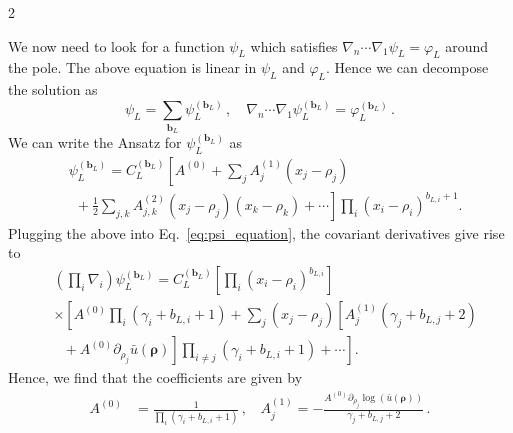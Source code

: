 \documentclass[fleqn]{2023SCGE}
\newcommand{\nn}{\nonumber}
\begin{document}
\begin{multicols}{2}
\begin{appendix}
We now need to look for a function $\psi_L$ which satisfies $\nabla_n \cdots \nabla_1 \psi_L = \varphi_L$ around the pole.
The above equation is linear in $\psi_L$ and $\varphi_L$. Hence we can decompose the solution as
\begin{equation}
    \psi_L = \sum_{\bm{b}_L} \psi_L^{(\bm{b}_L)} \, , \quad \nabla_n \cdots \nabla_1 \psi_L^{(\bm{b}_L)} = \varphi_L^{(\bm{b}_L)} \, .
    \label{eq:psi_equation}
\end{equation}
We can write the Ansatz for $\psi_L^{(\bm{b}_L)}$ as 
\begin{align}
&\psi_L^{(\bm{b}_L)} = C_L^{(\bm{b}_L)} \left[ A^{(0)} + \sum_j A^{(1)}_j (x_j - \rho_j) \right. \nn \\
&\left. ~~ + \frac{1}{2} \sum_{j,k} A^{(2)}_{j,k} (x_j-\rho_j) (x_k-\rho_k) + \cdots \right] \prod_i (x_i   -\rho_i)^{b_{L,i} + 1} .
\end{align}
Plugging the above into Eq.~\eqref{eq:psi_equation}, the covariant derivatives give rise to
\begin{align}
    &\left( \prod_i \nabla_i \right) \psi_L^{(\bm{b}_L)} = C_L^{(\bm{b}_L)} \left[ \prod_i (x_i-\rho_i)^{b_{L,i}} \right] \nonumber
    \\
    & \times \left[ A^{(0)} \prod_i (\gamma_i + b_{L,i} + 1) + \sum_j (x_j-\rho_j) \left[ A_j^{(1)} (\gamma_j + b_{L,j} + 2) \right. \right. \nn \\
    & \left. \left. ~~~ + A^{(0)} \partial_{\rho_j} \bar{u}(\bm{\rho}) \right] \prod_{i \neq j} (\gamma_i + b_{L,i} + 1) + \cdots \right] .
\end{align}
Hence, we find that the coefficients are given by
\begin{align}
    A^{(0)} &= \frac{1}{\prod_i(\gamma_i+b_{L,i}+1)} \,, ~~~~ A^{(1)}_j = -\frac{A^{(0)} \partial_{\rho_j} \log(\bar{u}(\bm{\rho}))}{\gamma_j+b_{L,j}+2}  \,.
\end{align}


\end{appendix}
\end{multicols}
\end{document}
